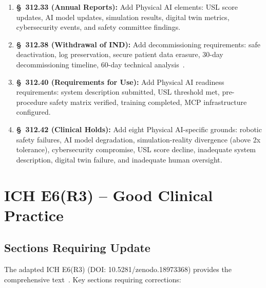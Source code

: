 \begin{enumerate}[label=(\alph*)]
\item \textbf{\S~312.33 (Annual Reports):} Add Physical AI elements: USL
  score updates, AI model updates, simulation results, digital twin metrics,
  cybersecurity events, and safety committee findings.

\item \textbf{\S~312.38 (Withdrawal of IND):} Add decommissioning
  requirements: safe deactivation, log preservation, secure patient data
  erasure, 30-day decommissioning timeline, 60-day technical
  analysis~\cite{cfr312adapt}.

\item \textbf{\S~312.40 (Requirements for Use):} Add Physical AI readiness
  requirements: system description submitted, USL threshold met, pre-procedure
  safety matrix verified, training completed, MCP infrastructure configured.

\item \textbf{\S~312.42 (Clinical Holds):} Add eight Physical AI-specific
  grounds: robotic safety failures, AI model degradation, simulation-reality
  divergence (above 2x tolerance), cybersecurity compromise, USL score
  decline, inadequate system description, digital twin failure, and
  inadequate human oversight.
\end{enumerate}

\section{ICH E6(R3) -- Good Clinical Practice}

\subsection{Sections Requiring Update}

The adapted ICH E6(R3) (DOI: 10.5281/zenodo.18973368) provides the
comprehensive text~\cite{iche6r3adapt}. Key sections requiring corrections:

